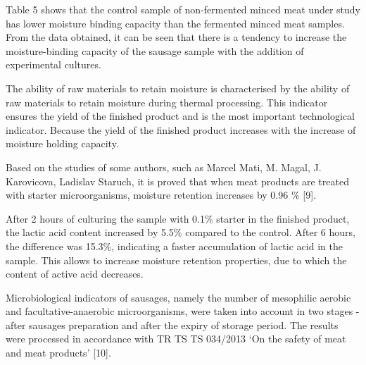 \begin{multicols}{2}
Table 5 shows that the control sample of non-fermented minced meat under
study has lower moisture binding capacity than the fermented minced meat
samples. From the data obtained, it can be seen that there is a tendency
to increase the moisture-binding capacity of the sausage sample with the
addition of experimental cultures.

The ability of raw materials to retain moisture is characterised by the
ability of raw materials to retain moisture during thermal processing.
This indicator ensures the yield of the finished product and is the most
important technological indicator. Because the yield of the finished
product increases with the increase of moisture holding capacity.

Based on the studies of some authors, such as Marcel Mati, M. Magal, J.
Karovicova, Ladislav Staruch, it is proved that when meat products are
treated with starter microorganisms, moisture retention increases by
0.96 \% {[}9{]}.

After 2 hours of culturing the sample with 0.1\% starter in the finished
product, the lactic acid content increased by 5.5\% compared to the
control. After 6 hours, the difference was 15.3\%, indicating a faster
accumulation of lactic acid in the sample. This allows to increase
moisture retention properties, due to which the content of active acid
decreases.

Microbiological indicators of sausages, namely the number of mesophilic
aerobic and facultative-anaerobic microorganisms, were taken into
account in two stages - after sausages preparation and after the expiry
of storage period. The results were processed in accordance with TR TS
TS 034/2013 `On the safety of meat and meat products' {[}10{]}.
\end{multicols}

